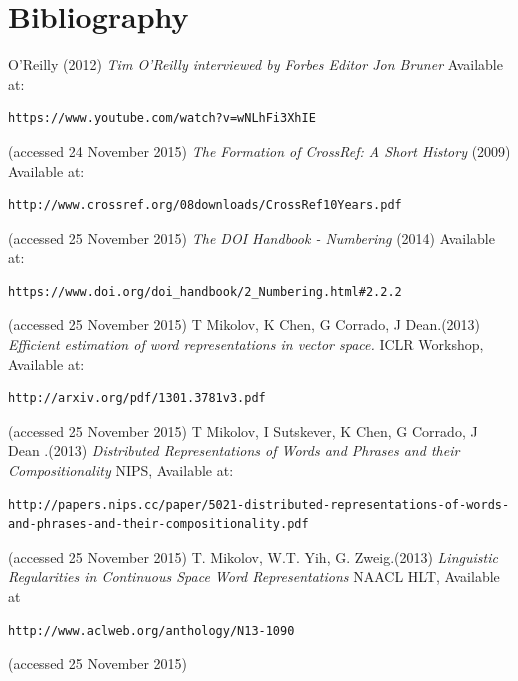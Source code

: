 \documentclass[11pt, oneside]{article}   	%
\begin{document}
\section{Bibliography}
\begin{thebibliography}{9}
 O'Reilly (2012) \emph{Tim O'Reilly interviewed by Forbes Editor Jon Bruner} Available at: \begin{verbatim}https://www.youtube.com/watch?v=wNLhFi3XhIE \end{verbatim} (accessed 24 November 2015)
\emph{The Formation of CrossRef: A Short History} (2009) Available at: \begin{verbatim}http://www.crossref.org/08downloads/CrossRef10Years.pdf\end{verbatim} (accessed 25 November 2015)
\emph{The DOI Handbook - Numbering} (2014) Available at: \begin{verbatim}https://www.doi.org/doi_handbook/2_Numbering.html#2.2.2\end{verbatim} (accessed 25 November 2015) 
T Mikolov, K Chen, G Corrado, J Dean.(2013) \emph{Efficient estimation of word representations in vector space. } ICLR Workshop, Available at: \begin{verbatim}http://arxiv.org/pdf/1301.3781v3.pdf\end{verbatim} (accessed 25 November 2015) 
T Mikolov, I Sutskever, K Chen, G Corrado, J Dean .(2013) \emph{Distributed Representations of Words and Phrases and their Compositionality} NIPS,  Available at: \begin{verbatim}http://papers.nips.cc/paper/5021-distributed-representations-of-words-and-phrases-and-their-compositionality.pdf\end{verbatim} (accessed 25 November 2015) 
T. Mikolov, W.T. Yih, G. Zweig.(2013) \emph{Linguistic Regularities in Continuous Space Word Representations} NAACL HLT, Available at \begin{verbatim}http://www.aclweb.org/anthology/N13-1090\end{verbatim} (accessed 25 November 2015) 

\end{thebibliography}
\end{document}
